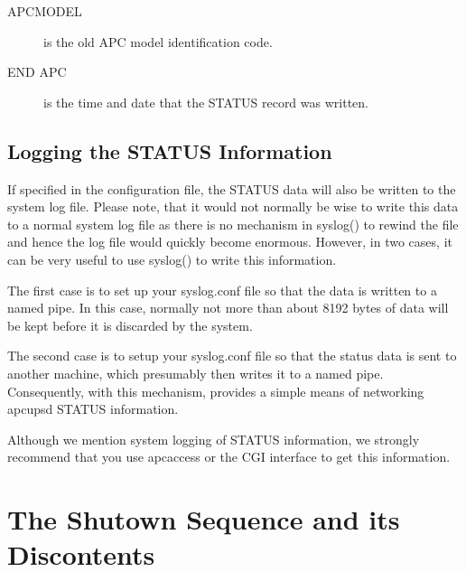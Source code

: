 {{{{{{{{\begin{description}
\item [APCMODEL]
   is the old APC model identification code.  

\item [END APC]
   is the time and date that the STATUS record was written. 
\end{description}

\label{Logging-the-STATUS-Information}

\subsection*{Logging the STATUS Information}

\label{index-Logging-Status-257}
\label{index-Status_002c-Logging-258}
If specified in the configuration file, the STATUS data will also be written
to the system log file. Please note, that it would not normally be wise to
write this data to a normal system log file as there is no mechanism in
syslog() to rewind the file and hence the log file would quickly become
enormous. However, in two cases, it can be very useful to use syslog() to
write this information.  

The first case is to set up your syslog.conf file so that the data is written
to a named pipe. In this case, normally not more than about 8192 bytes of data
will be kept before it is discarded by the system.  

The second case is to setup your syslog.conf file so that the status data is
sent to another machine, which presumably then writes it to a named pipe.
Consequently, with this mechanism, provides a simple means of networking
apcupsd STATUS information.  

Although we mention system logging of STATUS information, we strongly
recommend that you use apcaccess or the CGI interface to get this information.


\label{The-Shutown-Sequence-and-its-Discontents}

\section*{The Shutown Sequence and its Discontents}

}}}}}}}}
